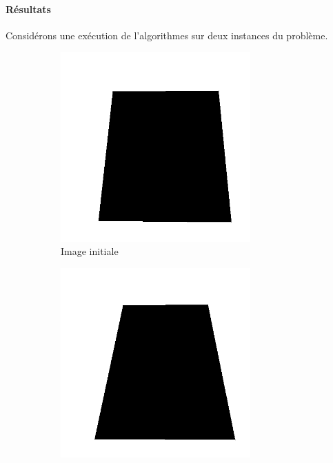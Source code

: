 \paragraph{Résultats} Considérons une exécution de l'algorithmes sur deux instances du problème.\\
\begin{figure}[h!]
        \centering
        \begin{subfigure}{0.4\textwidth}
            \centering
            \includegraphics[width=0.8\textwidth]{img/p1/1.png}
            \caption{Image initiale}
        \end{subfigure}
        \begin{subfigure}{0.4\textwidth}
            \centering
            \includegraphics[width=0.8\textwidth]{img/p1/2.png}

\end{subfigure}
\end{figure}
